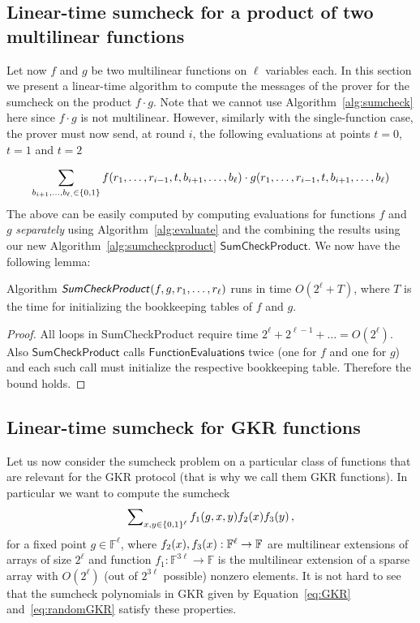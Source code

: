 \subsection{Linear-time sumcheck for a product of two multilinear functions\label{particular}}
Let now $f$ and $g$ be two multilinear functions on $\ell$ variables each. In this section we present a linear-time algorithm to compute the messages of the prover for the sumcheck on the product $f\cdot g$. Note that we cannot use Algorithm~\ref{alg:sumcheck} here since $f\cdot g$ is not multilinear. However, similarly with the single-function case, the prover must now send, at round $i$, the following evaluations at points $t = 0$, $t=1$ and $t=2$

$$\sum_{b_{i+1}, \ldots,b_{\ell, }\in\{0,1\}}f(r_1,\ldots, r_{i-1}, t, b_{i+1},\ldots, b_{\ell})\cdot g(r_1,\ldots, r_{i-1}, t, b_{i+1},\ldots, b_{\ell}) $$
The above can be easily computed by computing evaluations for functions $f$ and $g$ \emph{separately} using Algorithm~\ref{alg:evaluate} and the combining the results using our new Algorithm~\ref{alg:sumcheckproduct} $\textsf{SumCheckProduct}$. We now have the following lemma:
\begin{lemma}\label{main_lemma_complexity}
Algorithm $\textsf{\emph{SumCheckProduct}}(f,g,r_1,\ldots,r_\ell)$ runs in time $O(2^\ell + T)$, where $T$ is the time for initializing the bookkeeping tables of $f$ and $g$.
\end{lemma}
\begin{proof}
All loops in \textsf{SumCheckProduct} require time $2^\ell+2^{\ell-1}+\ldots=O(2^\ell)$. Also $\textsf{SumCheckProduct}$ calls $\textsf{FunctionEvaluations}$ twice (one for $f$ and one for $g$) and each such call must initialize the respective bookkeeping table. Therefore the bound holds.
\end{proof}



\subsection{Linear-time sumcheck for GKR functions}
Let us now consider the sumcheck problem on a particular class of functions that are relevant for the GKR protocol (that is why we call them GKR functions). In particular we want to compute the sumcheck 
\begin{equation}\label{eq:linearsc}
\sum\nolimits_{x,y\in\{0,1\}^\ell}f_1(g,x,y)f_2(x)f_3(y)\, ,
\end{equation}
for a fixed point $g\in\mathbb{F}^\ell$, where $f_2(x),f_3(x): \mathbb{F}^\ell\rightarrow \mathbb{F}$ are multilinear extensions of arrays of size $2^\ell$ and function $f_1:\mathbb{F}^{3\ell}\rightarrow\mathbb{F}$ is the multilinear extension of a sparse array with $O(2^\ell)$ (out of $2^{3\ell}$ possible) nonzero elements. 
It is not hard to see that the sumcheck polynomials in GKR given by Equation~\ref{eq:GKR} and~\ref{eq:randomGKR} satisfy these properties.


